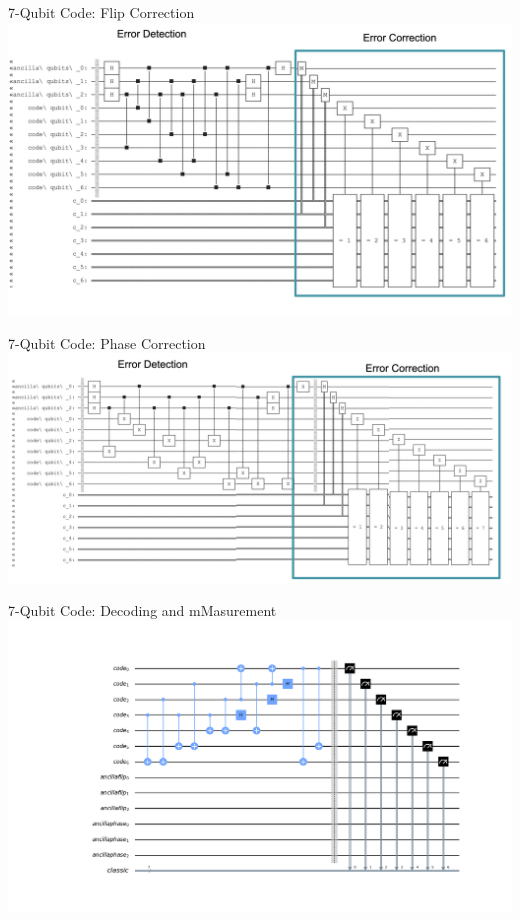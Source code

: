 \documentclass{beamer}
\begin{document}
\begin{frame}{7-Qubit Code: Flip Correction}
  \includegraphics[width=\textwidth]{7qb_correction_diagram}
\end{frame}

\begin{frame}{7-Qubit Code: Phase Correction}
  \includegraphics[width=\textwidth]{7qb_phase_correction}
\end{frame}

\begin{frame}{7-Qubit Code: Decoding and mMasurement}
  \includegraphics[width=\textwidth]{7qb_end}
\end{frame}
\end{document}
